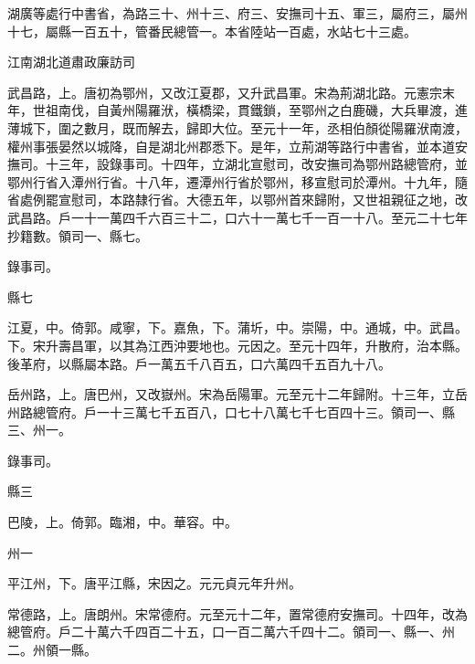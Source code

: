 
\begin{pinyinscope}

 湖廣等處行中書省，為路三十、州十三、府三、安撫司十五、軍三，屬府三，屬州十七，屬縣一百五十，管番民總管一。本省陸站一百處，水站七十三處。



 江南湖北道肅政廉訪司



 武昌路，上。唐初為鄂州，又改江夏郡，又升武昌軍。宋為荊湖北路。元憲宗末年，世祖南伐，自黃州陽羅洑，橫橋梁，貫鐵鎖，至鄂州之白鹿磯，大兵畢渡，進薄城下，圍之數月，既而解去，歸即大位。至元十一年，丞相伯顏從陽羅洑南渡，權州事張晏然以城降，自是湖北州郡悉下。是年，立荊湖等路行中書省，並本道安撫司。十三年，設錄事司。十四年，立湖北宣慰司，改安撫司為鄂州路總管府，並鄂州行省入潭州行省。十八年，遷潭州行省於鄂州，移宣慰司於潭州。十九年，隨省處例罷宣慰司，本路隸行省。大德五年，以鄂州首來歸附，又世祖親征之地，改武昌路。戶一十一萬四千六百三十二，口六十一萬七千一百一十八。至元二十七年抄籍數。領司一、縣七。



 錄事司。



 縣七



 江夏，中。倚郭。咸寧，下。嘉魚，下。蒲圻，中。崇陽，中。通城，中。武昌。下。宋升壽昌軍，以其為江西沖要地也。元因之。至元十四年，升散府，治本縣。後革府，以縣屬本路。戶一萬五千八百五，口六萬四千五百九十八。



 岳州路，上。唐巴州，又改嶽州。宋為岳陽軍。元至元十二年歸附。十三年，立岳州路總管府。戶一十三萬七千五百八，口七十八萬七千七百四十三。領司一、縣三、州一。



 錄事司。



 縣三



 巴陵，上。倚郭。臨湘，中。華容。中。



 州一



 平江州，下。唐平江縣，宋因之。元元貞元年升州。



 常德路，上。唐朗州。宋常德府。元至元十二年，置常德府安撫司。十四年，改為總管府。戶二十萬六千四百二十五，口一百二萬六千四十二。領司一、縣一、州二。州領一縣。




\end{pinyinscope}
